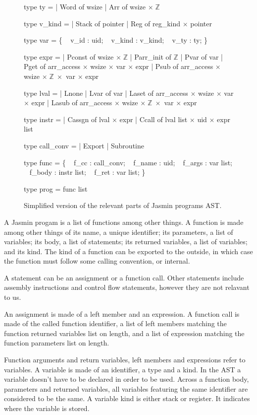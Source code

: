 \documentclass{article}
\newcommand\setZ{\mathbb{Z}}
\begin{document}
\begin{figure}[p]
\obeylines\obeyspaces\ttfamily%
type ty =
| Word of wsize
| Arr  of wsize \(\times\;\setZ\)

type v\_kind =
| Stack of pointer
| Reg   of reg\_kind \(\times\) pointer

type var = \{
~ v\_id   : uid;
~ v\_kind : v\_kind;
~ v\_ty   : ty;
\}

type expr =
| Pconst of wsize \(\times\;\setZ\)
| Parr\_init of \(\setZ\)
| Pvar   of var
| Pget   of arr\_access \(\times\) wsize \(\times\) var \(\times\) expr
| Psub   of arr\_access \(\times\) wsize \(\times\;\setZ\;\times\) var \(\times\) expr

type lval =
| Lnone
| Lvar  of var
| Laset of arr\_access \(\times\) wsize \(\times\) var \(\times\) expr
| Lasub of arr\_access \(\times\) wsize \(\times\;\setZ\;\times\) var \(\times\) expr

type instr =
| Cassgn of lval \(\times\) expr
| Ccall  of lval list \(\times\) uid \(\times\) expr list

type call\_conv =
| Export
| Subroutine

type func = \{
~ f\_cc   : call\_conv;
~ f\_name : uid;
~ f\_args : var list;
~ f\_body : instr list;
~ f\_ret  : var list;
\}

type prog = func list
\normalfont%
\caption{Simplified version of the relevant parts of Jasmin programs AST.}
\end{figure}

A Jasmin progam is a list of functions among other things. A function is made
among other things of its name, a unique identifier; its parameters, a list of
variables; its body, a list of statements; its returned variables, a list of
variables; and its kind. The kind of a function can be exported to the outside,
in which case the function must follow some calling convention, or internal.

\smallskip

A statement can be an assignment or a function call.
Other statements include assembly instructions and control flow statements,
however they are not relavant to us.

An assignment is made of a left member and an expression. A function call is
made of the called function identifier, a list of left members matching the
function returned variables list on length, and a list of expression matching
the function parameters list on length.

Function arguments and return variables, left members and expressions refer to
variables. A variable is made of an identifier, a type and a kind. In the AST a
variable doesn't have to be declared in order to be used. Across a function
body, parameters and returned variables, all variables featuring the same
identifier are considered to be the same. A variable kind is either stack or
register. It indicates where the variable is stored.
\end{document}
